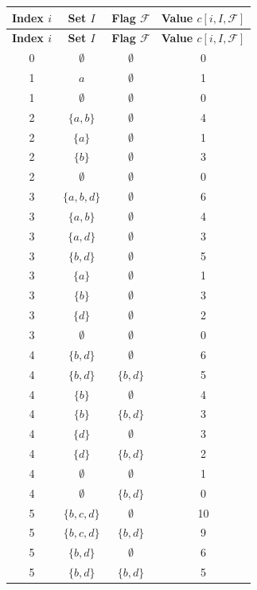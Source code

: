 \begin{minipage}{0.45\textwidth}
    \begin{longtable}{|c|c|c|c|}
    \hline
    \textbf{Index \(i\)} & \textbf{Set \(I\)} & \textbf{Flag \( \mathcal{F} \)} & \textbf{Value \( c[i, I, \mathcal{F}] \)} \\
    \hline
    \endfirsthead
    \hline
    \textbf{Index \(i\)} & \textbf{Set \(I\)} & \textbf{Flag \( \mathcal{F} \)} & \textbf{Value \( c[i, I, \mathcal{F}] \)} \\
    \hline
    \endhead
    \hline
    \endfoot
    0 & \( \emptyset \) & \( \emptyset \) & 0 \\
    \hline
    1 & \( a \) & \( \emptyset \) & 1 \\
    1 & \( \emptyset \) & \( \emptyset \) & 0 \\
    \hline
    2 & \( \{ a, b \} \) & \( \emptyset \) & 4 \\
    2 & \( \{ a \} \) & \( \emptyset \) & 1 \\
    2 & \( \{ b \} \) & \( \emptyset \) & 3 \\
    2 & \( \emptyset \) & \( \emptyset \) & 0 \\
    \hline
    3 & \( \{ a, b, d \} \) & \( \emptyset \) & 6 \\
    3 & \( \{ a, b \} \) & \( \emptyset \) & 4 \\
    3 & \( \{ a, d \} \) & \( \emptyset \) & 3 \\
    3 & \( \{ b, d \} \) & \( \emptyset \) & 5 \\
    3 & \( \{ a \} \) & \( \emptyset \) & 1 \\
    3 & \( \{ b \} \) & \( \emptyset \) & 3 \\
    3 & \( \{ d \} \) & \( \emptyset \) & 2 \\
    3 & \( \emptyset \) & \( \emptyset \) & 0 \\
    \hline
    4 & \( \{ b, d \} \) & \( \emptyset \) & 6 \\
    4 & \( \{ b, d \} \) & \( \{ b, d \} \) & 5 \\
    
    4 & \( \{ b \} \) & \( \emptyset \) & 4 \\
    4 & \( \{ b \} \) & \( \{ b, d \} \) & 3 \\
    4 & \( \{ d \} \) & \( \emptyset \) & 3 \\
    4 & \( \{ d \} \) & \( \{ b, d \} \) & 2 \\
    4 & \( \emptyset \) & \( \emptyset \) & 1 \\
    4 & \( \emptyset \) & \( \{ b, d \} \) & 0 \\
    \hline

    5 & \( \{ b, c, d \} \) & \( \emptyset \) & 10 \\
    5 & \( \{ b, c, d \} \) & \( \{ b,d \} \) & 9 \\
    5 & \( \{ b, d \} \) & \( \emptyset \) & 6 \\
    5 & \( \{ b, d \} \) & \( \{ b, d \} \) & 5 \\
    \hline
    \end{longtable}
    \end{minipage}%
